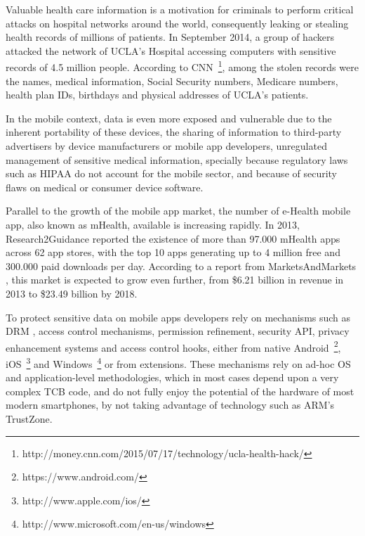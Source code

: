 Valuable health care information is a motivation for criminals to perform critical attacks on hospital networks around the world, consequently leaking or stealing health records of millions of patients. In September 2014, a group of hackers attacked the network of \ac{UCLA}'s Hospital accessing computers with sensitive records of 4.5 million people. According to \ac{CNN}~\footnote{http://money.cnn.com/2015/07/17/technology/ucla-health-hack/}, among the stolen records were the names, medical information, Social Security numbers, Medicare numbers, health plan IDs, birthdays and physical addresses of \ac{UCLA}'s patients.

In the mobile context, data is even more exposed and vulnerable due to the inherent portability of these devices, the sharing of information to third-party advertisers by device manufacturers or mobile app developers, unregulated management of sensitive medical information, specially because regulatory laws such as \ac{HIPAA} do not account for the mobile sector, and because of security flaws on medical or consumer device software.

Parallel to the growth of the mobile app market, the number of e-Health mobile app, also known as \ac{mHealth}, available is increasing rapidly. In 2013, Research2Guidance \cite{research2guidance} reported the existence of more than 97.000 \ac{mHealth} apps across 62 app stores, with the top 10 apps generating up to 4 million free and 300.000 paid downloads per day. According to a report from MarketsAndMarkets \cite{marketsandmarkets}, this market is expected to grow even further, from \$6.21 billion in revenue in 2013 to \$23.49 billion by 2018.


To protect sensitive data on mobile apps developers rely on mechanisms such as \ac{DRM} \cite{drm}, access control mechanisms, permission refinement, security \ac{API}, privacy enhancement systems and access control hooks, either from native Android~\footnote{https://www.android.com/}, iOS~\footnote{http://www.apple.com/ios/} and Windows~\footnote{http://www.microsoft.com/en-us/windows} or from extensions. These mechanisms rely on ad-hoc \ac{OS} and application-level methodologies, which in most cases depend upon a very complex \ac{TCB} code, and do not fully enjoy the potential of the hardware of most modern smartphones, by not taking advantage of technology such as ARM's TrustZone.\\

